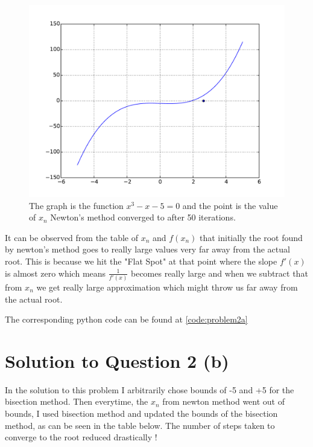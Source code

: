 \documentclass[a4paper,11pt]{article}
\begin{document}
\begin{figure}[h]
	\centering
	\includegraphics[scale=0.45]{solution2a_fig.pdf}
	\caption{The graph is the function $x^3 - x - 5 = 0$ and the point is the value of $x_n$ Newton's method converged to after 50 iterations.}
	\label{fig:solution2a_fig}
\end{figure}
	
It can be observed from the table of $x_n$ and $f(x_n)$ that initially the root found by newton's method goes to really large values very far away from the actual root. This is because we hit the "Flat Spot" at that point where the slope $f'(x)$ is almost zero which means $\frac{1}{f'(x)}$ becomes really large and when we subtract that from $x_n$ we get really large approximation which might throw us far away from the actual root.

The corresponding python code can be found at \ref{code:problem2a}
\clearpage

\section{Solution to Question 2 (b)}\label{prob2b}

In the solution to this problem I arbitrarily chose bounds of -5 and +5 for the bisection method. Then everytime, the $x_n$ from newton method went out of bounds, I used bisection method and updated the bounds of the bisection method, as can be seen in the table below. The number of steps taken to converge to the root reduced drastically !
\end{document}
